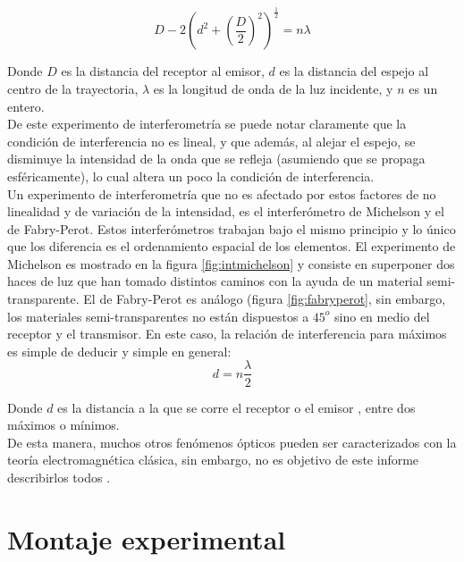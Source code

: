 \documentclass[%
 reprint,
 amsmath,amssymb,
 aps,
]{revtex4-1}
\begin{document}
\begin{equation}
D-2{\left(d^2 + {\left(\frac{D}{2}\right)}^2\right)}^\frac{1}{2} = n\lambda
\label{eq:Lloyd}
\end{equation}

Donde $D$ es la distancia del receptor al emisor, $d$ es la distancia del espejo al centro de la trayectoria, $\lambda$ es la longitud de onda de la luz incidente, y $n$ es un entero.\\

De este experimento de interferometría se puede notar claramente que la condición de interferencia no es lineal, y que además, al alejar el espejo, se disminuye la intensidad de la onda que se refleja (asumiendo que se propaga esféricamente), lo cual altera un poco la condición de interferencia.\\

Un experimento de interferometría que no es afectado por estos factores de no linealidad y de variación de la intensidad, es el interferómetro de Michelson y el de Fabry-Perot. Estos interferómetros trabajan bajo el mismo principio y lo único que los diferencia es el ordenamiento espacial de los elementos. El experimento de Michelson es mostrado en la figura \ref{fig:intmichelson} y consiste en superponer dos haces de luz que han tomado distintos caminos con la ayuda de un material semi-transparente. El de Fabry-Perot es análogo (figura \ref{fig:fabryperot}, sin embargo, los materiales semi-transparentes no están dispuestos a $45^o$ sino en medio del receptor y el transmisor.  En este caso, la relación de interferencia para máximos es simple de deducir y simple en general:\\

\begin{equation}
d = n\frac{\lambda}{2}
\label{eq:Michelson}
\end{equation}

Donde $d$ es la distancia a la que se corre el receptor o el emisor , entre dos máximos o mínimos. \\

De esta manera, muchos otros fenómenos ópticos pueden ser caracterizados con la teoría electromagnética clásica, sin embargo, no es objetivo de este informe describirlos todos .\\ 


\section{\label{sec:level1}Montaje experimental}
\end{document}
